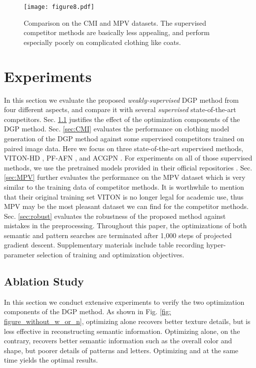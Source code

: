 \documentclass[10pt,twocolumn,letterpaper]{article}
\begin{document}
\begin{figure*}[t]
  \centering
  \texttt{[image: figure8.pdf]}\caption{Comparison on the CMI and MPV datasets. The supervised competitor methods are basically less appealing, and perform especially poorly on complicated clothing like coats.}\label{fig: compare_CMI}\end{figure*}

\section{Experiments}
In this section we evaluate the proposed \textit{weakly-supervised} DGP method from four different aspects, and compare it with several \textit{supervised} state-of-the-art competitors. Sec. \ref{sec:ablation} justifies the effect of the optimization components of the DGP method. Sec. \ref{sec:CMI} evaluates the performance on clothing model generation of the DGP method against some supervised competitors trained on paired image data. Here we focus on three state-of-the-art supervised methods, VITON-HD \cite{choi2021viton}, PF-AFN \cite{ge2021parser,han2019clothflow}, and ACGPN \cite{yang2020towards}. For experiments on all of those supervised methods, we use the pretrained models provided in their official repositories \cite{vitonhdcode,acpgncode,pfancode}. Sec. \ref{sec:MPV} further evaluates the performance on the MPV \cite{dong2019towards} dataset which is very similar to the training data \cite{han2018viton} of competitor methods. It is worthwhile to mention that their original training set VITON \cite{han2018viton} is no longer legal for academic use, thus MPV \cite{dong2019towards} may be the most pleasant dataset we can find for the competitor methods. Sec. \ref{sec:robust} evaluates the robustness of the proposed method against mistakes in the preprocessing. Throughout this paper, the optimizations of both semantic and pattern searches are terminated after 1,000 steps of projected gradient descent. Supplementary materials include table recording hyper-parameter selection of training and optimization objectives.

\subsection{Ablation Study}\label{sec:ablation}
In this section we conduct extensive experiments to verify the two optimization components of the DGP method. 
As shown in Fig. \ref{fig: figure_without_w_or_n}, optimizing  alone recovers better texture details, but is less effective in reconstructing semantic information.
Optimizing  alone, on the contrary, recovers better semantic information such as the overall color and shape, but poorer details of patterns and letters. Optimizing  and  at the same time yields the optimal results.
\end{document}
